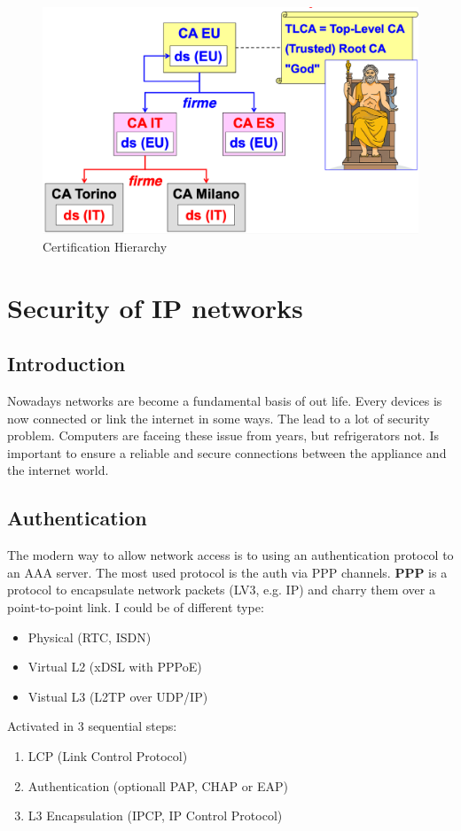 \documentclass[12pt]{article}
\begin{document}
\begin{figure}[H]
   \centering
   \includegraphics[width=\linewidth]{images/ca_god.png}
   \caption{Certification Hierarchy}
   \label{fig:ca_god}
\end{figure} %

\newpage %
\section{Security of IP networks}
\subsection{Introduction}
Nowadays networks are become a fundamental basis of out life. Every devices is now connected or link the internet in some ways. The lead to a lot of security problem. Computers are faceing these issue from years, but refrigerators not. Is important to ensure a reliable and secure connections between the appliance and the internet world.

\subsection{Authentication}
The modern way to allow network access is to using an authentication protocol to an AAA server.
The most used protocol is the auth via PPP channels. \textbf{PPP} is a protocol to encapsulate network packets (LV3, e.g. IP) and charry them over a point-to-point link. I could be of different type:
\begin{itemize}
  \item Physical (RTC, ISDN)
  \item Virtual L2 (xDSL with PPPoE)
  \item Vistual L3 (L2TP over UDP/IP)
\end{itemize}
Activated in 3 sequential steps:
\begin{enumerate}
  \item LCP (Link Control Protocol)
  \item Authentication (optionall PAP, CHAP or EAP)
  \item L3 Encapsulation (IPCP, IP Control Protocol)
\end{enumerate}
\end{document}
